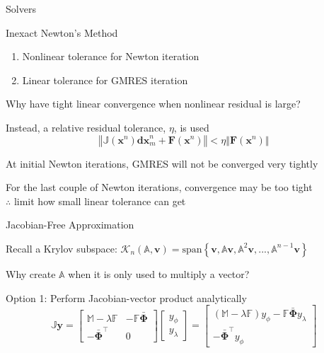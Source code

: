 \documentclass{beamer}
\begin{document}
\begin{section}{Solvers}
\begin{frame}{Inexact Newton's Method}
\begin{customlist}{2ex}{0pt}
\begin{enumerate}
    \item Nonlinear tolerance for Newton iteration
    \item Linear tolerance for GMRES iteration
  \end{enumerate}
  \vfill\item Why have tight linear convergence when nonlinear residual is large?
  \vfill\item Instead, a relative residual tolerance, $\eta$, is used
  \[
   \left\Vert \mathbb{J}\left(\mathbf{x}^{n}\right)\mathbf{dx}_{m}^{n}+\mathbf{F}\left(\mathbf{x}^{n}\right)\right\Vert <\eta\left\Vert \mathbf{F}\left(\mathbf{x}^{n}\right)\right\Vert
  \]
  \vfill\item At initial Newton iterations, GMRES will not be converged very tightly
  \vfill\item For the last couple of Newton iterations, convergence may be too tight \\ $\therefore$ limit how small linear tolerance can get
\end{customlist}
\end{frame}
\begin{frame}{Jacobian-Free Approximation}
\begin{customlist}{2ex}{0pt}
  \item Recall a Krylov subspace: $\mathcal{K}_{n}\left(\mathbb{A},\mathbf{v}\right)=\mathrm{span}\left\{ \mathbf{v},\mathbb{A}\mathbf{v},\mathbb{A}^{2}\mathbf{v},...,\mathbb{A}^{n-1}\mathbf{v}\right\}$
  \vfill\item Why create $\mathbb{A}$ when it is only used to multiply a vector?
  \vfill\item Option 1: Perform Jacobian-vector product analytically
  \[
   \mathbb{J}\mathbf{y}=\left[\begin{array}{cc}
    \mathbb{M}-\lambda\mathbb{F} & -\mathbb{F}\bar{\mathbf{\Phi}}\\
    -\bar{\mathbf{\Phi}}^{\top} & 0
    \end{array}\right]\left[\begin{array}{c}
    y_{\phi}\\
    y_{\lambda}
    \end{array}\right]=\left[\begin{array}{c}
    \left(\mathbb{M}-\lambda\mathbb{F}\right)y_{\phi}-\mathbb{F}\bar{\mathbf{\Phi}}y_{\lambda}\\
    -\bar{\mathbf{\Phi}}^{\top}y_{\phi}
    \end{array}\right]
\]
\end{customlist}
\end{frame}
\end{section}
\end{document}
